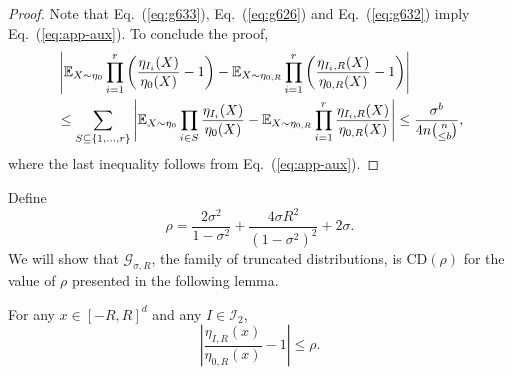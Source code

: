 \documentclass[final, 12pt]{colt2018}
\providecommand{\CD}{\mathrm{CD}}
\renewcommand{\eqref}[1]{Eq.~(\ref{#1})}
\begin{document}
\begin{proof}
Note that \eqref{eq:g633}, \eqref{eq:g626} and \eqref{eq:g632} imply \eqref{eq:app-aux}. To conclude the proof,
\begin{align}
&\left\lvert \mathbb{E}_{X\sim \eta_0} \prod_{i=1}^r \left( \frac{\eta_{I_i}(X)}{\eta_0(X)}-1 \right) 
-  \mathbb{E}_{X\sim \eta_{0,R}} \prod_{i=1}^r \left( \frac{\eta_{I_i,R}(X)}{\eta_{0,R}(X)}-1 \right) \right\rvert \notag\\
&\le \sum_{S \subseteq \{1,\dots, r\}} 
\left\lvert \mathbb{E}_{X\sim \eta_0} \prod_{i\in S} \frac{\eta_{I_i}(X)}{\eta_0(X)}
-  \mathbb{E}_{X\sim \eta_{0,R}} \prod_{i=1}^r \frac{\eta_{I_i,R}(X)}{\eta_{0,R}(X)}\right\rvert
\le \frac{\sigma^b}{4n {\binom{n}{\le b}}},\notag
\end{align}
where the last inequality follows from \eqref{eq:app-aux}.
\end{proof}

Define
\begin{equation} \label{eq:grhodef}
\rho = \frac{2\sigma^2}{1-\sigma^2} + \frac{4\sigma R^2}{\left(1-\sigma^2\right)^2} + 2\sigma.
\end{equation}
We will show that $\mathcal{G}_{\sigma,R}$, the family of truncated distributions, is $\CD(\rho)$ for the value of $\rho$ presented in the following lemma.

\begin{lemma} \label{lem:g-rho}
For any $x \in [-R,R]^d$ and any $I \in \mathcal{I}_2$,
\[
\left \lvert \frac{\eta_{I,R}(x)}{\eta_{0,R}(x)} - 1 \right\rvert
\le \rho.
\]
\end{lemma}
\end{document}
